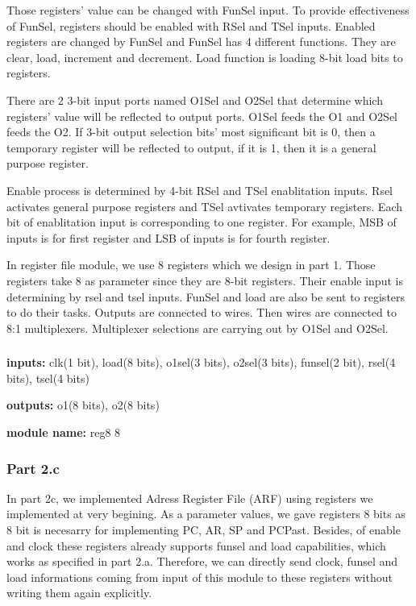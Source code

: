 \documentclass[pdftex,12pt,a4paper]{article}
\begin{document}
Those registers' value can be changed 
with FunSel input. To provide effectiveness of FunSel, registers should be enabled
with RSel and TSel inputs. Enabled registers are changed by FunSel and FunSel has
4 different functions. They are clear, load, increment and decrement. Load function
is loading 8-bit load bits to registers.

There are 2 3-bit input ports named O1Sel and O2Sel that determine which registers' 
value will be reflected to output ports. O1Sel feeds the O1 and O2Sel feeds the O2.
If 3-bit output selection bits' most significant bit is 0, then a temporary register
will be reflected to output, if it is 1, then it is a general purpose register.

Enable process is determined by 4-bit RSel and TSel enablitation inputs. Rsel activates
general purpose registers and TSel avtivates temporary registers. Each bit of
enablitation input is corresponding to one register. For example, MSB of inputs is
for first register and LSB of inputs is for fourth register.

In register file module, we use 8 registers which we design in part 1. Those registers
take 8 as parameter since they are 8-bit registers. Their enable input is determining by
rsel and tsel inputs. FunSel and load are also be sent to registers to do their tasks.
Outputs are connected to wires. Then wires are connected to 8:1 multiplexers. Multiplexer
selections are carrying out by O1Sel and O2Sel. 

\subsubsection{}
\textbf{inputs:} clk(1 bit),
load(8 bits),
o1sel(3 bits),
o2sel(3 bits),
funsel(2 bit),
rsel(4 bits),
tsel(4 bits)

\textbf{outputs:} 
o1(8 bits),
o2(8 bits)

\textbf{module name:} reg8 8

\subsubsection{Part 2.c}
In part 2c, we implemented Adress Register File (ARF) using registers we implemented at 
very begining. As a parameter values, we gave registers 8 bits as 8 bit is necesarry for 
implementing PC, AR, SP and PCPast. Besides, of enable and clock these registers 
already supports funsel and load capabilities, which works as specified in part 2.a. 
Therefore, we can directly send clock, funsel and load informations coming from 
input of this module to these registers without writing them again explicitly.
\end{document}
